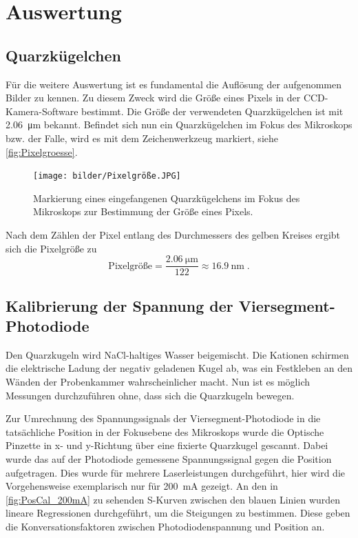 \newpage
\section{Auswertung}

\subsection{Quarzkügelchen}
    Für die weitere Auswertung ist es fundamental die Auflösung der aufgenommen Bilder zu kennen.
    Zu diesem Zweck wird die Größe eines Pixels in der CCD-Kamera-Software bestimmt.
    Die Größe der verwendeten Quarzkügelchen ist mit \qty{2,06}{\um} bekannt.
    Befindet sich nun ein Quarzkügelchen im Fokus des Mikroskops bzw. der Falle, wird es mit dem Zeichenwerkzeug markiert, siehe \autoref{fig:Pixelgroesse}.
    \begin{figure}[ht]
        \centering\captionsetup{format=plain}
        \texttt{[image: bilder/Pixelgröße.JPG]}
        \caption{Markierung eines eingefangenen Quarzkügelchens im Fokus des Mikroskops zur Bestimmung der Größe eines Pixels.}
        \label{fig:Pixelgroesse}
    \end{figure}
    \FloatBarrier
    Nach dem Zählen der Pixel entlang des Durchmessers des gelben Kreises ergibt sich die Pixelgröße zu
    \begin{equation}
        \mathrm{Pixelgröße} = \frac{\SI{2,06}{\um}}{122} \approx \SI{16,9}{\nm} \;.
    \end{equation}

\subsection{Kalibrierung der Spannung der Viersegment-Photodiode}
    Den Quarzkugeln wird NaCl-haltiges Wasser beigemischt.
    Die Kationen schirmen die elektrische Ladung der negativ geladenen Kugel ab, was ein Festkleben an den Wänden der Probenkammer wahrscheinlicher macht.
    Nun ist es möglich Messungen durchzuführen ohne, dass sich die Quarzkugeln bewegen.

    Zur Umrechnung des Spannungssignals der Viersegment-Photodiode in die tatsächliche Position in der Fokusebene des Mikroskops wurde die Optische Pinzette in x- und y-Richtung über eine fixierte Quarzkugel gescannt.
    Dabei wurde das auf der Photodiode gemessene Spannungssignal gegen die Position aufgetragen.
    Dies wurde für mehrere Laserleistungen durchgeführt, hier wird die Vorgehensweise exemplarisch nur für \qty{200}{mA} gezeigt.
    An den in \autoref{fig:PosCal_200mA} zu sehenden S-Kurven zwischen den blauen Linien wurden lineare Regressionen durchgeführt, um die Steigungen zu bestimmen.
    Diese geben die Konversationsfaktoren zwischen Photodiodenspannung und Position an.

